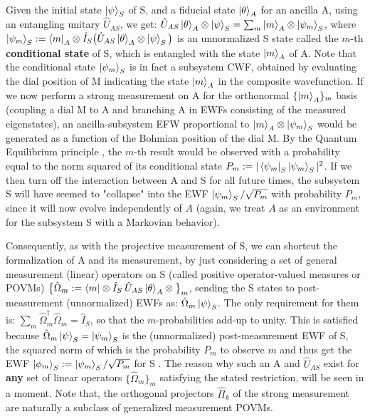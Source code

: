 \documentclass[11pt, a4paper]{article} %
\begin{document}
Given the initial state $\ket{\psi}_S$ of S, and a fiducial state $\ket{\theta}_A$ for an ancilla A, using an entangling unitary $\hat{U}_{AS}$, we get: $\hat{U}_{AS}\ket{\theta}_A\otimes\ket{\psi}_S=\sum_m \ket{m}_A\otimes \ket{\psi_m}_S$, where $\ket{\psi_m}_S:=\bra{m}_A\otimes\hat{I}_S \big(\hat{U}_{AS}\ket{\theta}_A\otimes\ket{\psi}_S\big)$ is an unnormalized S state called the $m$-th {\bf conditional state} of S, which is entangled with the state $\ket{m}_A$ of A. Note that the conditional state $\ket{\psi_m}_S$ is in fact a subsystem CWF, obtained by evaluating the dial position of M indicating the state $\ket{m}_A$ in the composite wavefunction. If we now perform a strong measurement on A for the orthonormal $\{\ket{m}_A\}_m$ basis (coupling a dial M to A and branching A in EWFs consisting of the measured eigenstates), an ancilla-subsystem EFW proportional to $\ket{m}_A\otimes \ket{\psi_m}_S$ would be generated as a function of the Bohmian position of the dial M. By the Quantum Equilibrium principle \cite{Absolute}, the $m$-th result would be observed with a probability equal to the norm squared of its conditional state $P_m:=|\bra{\psi_m}_S\ket{\psi_m}_S|^2$. If we then turn off the interaction between A and S for all future times, the subsystem S will have seemed to "collapse" into the EWF $\ket{\psi_m}_S/\sqrt{P_m}$ with probability $P_m$, since it will now evolve independently of $A$ (again, we treat $A$ as an environment for the subsystem S with a Markovian behavior). 

Consequently, as with the projective measurement of S, we can shortcut the formalization of A and its measurement, by just considering a set of general measurement (linear) operators on S (called positive operator-valued measures or POVMs) $\big\{\hat{\Omega}_m:=\bra{m}\otimes\hat{I}_S\:\hat{U}_{AS}\ket{\theta}_A\otimes\big\}_m$, sending the S states to post-measurement (unnormalized) EWFs as: $\hat{\Omega}_m\ket{\psi}_S$. The only requirement for them is: $\sum_m \hat{\Omega}_m^\dagger\hat{\Omega}_m=\hat{I}_S$, so that the $m$-probabilities add-up to unity. This is satisfied because $\hat{\Omega}_m\ket{\psi}_S=\ket{\psi_m}_S$ is the (unnormalized) post-measurement EWF of S, the squared norm of which is the probability $P_m$ to observe $m$ and thus get the EWF $\ket{\phi_m}_S:=\ket{\psi_m}_S/\sqrt{P_m}$ for S \cite{Generalized, Durr}. The reason why such an A and $\hat{U}_{AS}$  exist for {\bf any} set of linear operators $\{\hat{\Omega}_m\}_m$ satisfying the stated restriction, will be seen in a moment. Note that, the orthogonal projectors $\hat{\Pi}_k$ of the strong measurement are naturally a subclass of generalized measurement POVMs.\vspace{-0.2cm}
\end{document}
